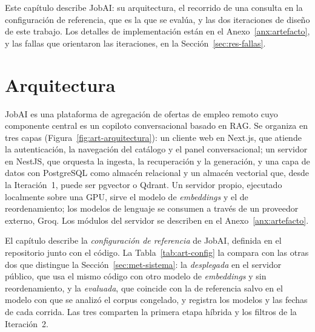 Este capítulo describe JobAI: su arquitectura, el recorrido de una consulta en la configuración de referencia, que es la que se evalúa, y las dos iteraciones de diseño de este trabajo. Los detalles de implementación están en el Anexo~\ref{anx:artefacto}, y las fallas que orientaron las iteraciones, en la Sección~\ref{sec:res-fallas}.

\section{Arquitectura}
\label{sec:art-arquitectura}

JobAI es una plataforma de agregación de ofertas de empleo remoto cuyo componente central es un copiloto conversacional basado en RAG. Se organiza en tres capas (Figura~\ref{fig:art-arquitectura}): un cliente web en Next.js, que atiende la autenticación, la navegación del catálogo y el panel conversacional; un servidor en NestJS, que orquesta la ingesta, la recuperación y la generación, y una capa de datos con PostgreSQL como almacén relacional y un almacén vectorial que, desde la Iteración~1, puede ser pgvector o Qdrant. Un servidor propio, ejecutado localmente sobre una GPU, sirve el modelo de \textit{embeddings} y el de reordenamiento; los modelos de lenguaje se consumen a través de un proveedor externo, Groq. Los módulos del servidor se describen en el Anexo~\ref{anx:artefacto}.

El capítulo describe la \emph{configuración de referencia} de JobAI, definida en el repositorio junto con el código. La Tabla~\ref{tab:art-config} la compara con las otras dos que distingue la Sección~\ref{sec:met-sistema}: la \emph{desplegada} en el servidor público, que usa el mismo código con otro modelo de \textit{embeddings} y sin reordenamiento, y la \emph{evaluada}, que coincide con la de referencia salvo en el modelo con que se analizó el corpus congelado, y registra los modelos y las fechas de cada corrida. Las tres comparten la primera etapa híbrida y los filtros de la Iteración~2.

